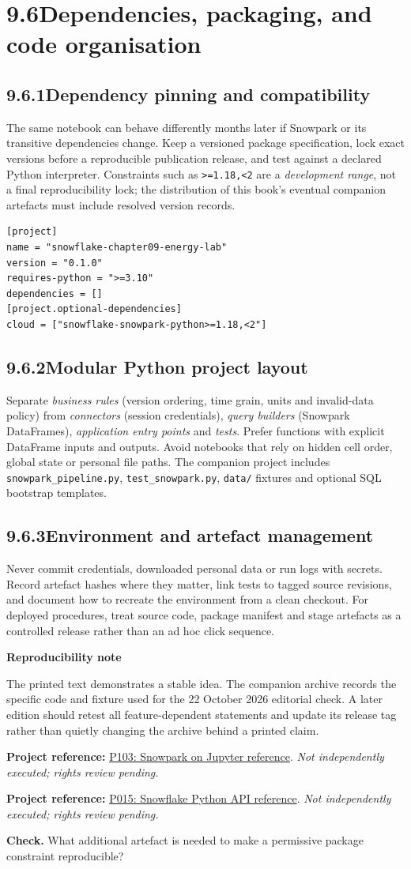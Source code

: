 \documentclass[11pt,twoside]{article}
\newcommand{\topic}[2]{\subsection*{#1\quad #2}}
\newcommand{\repo}[2]{\par\begingroup\fontsize{8.0}{9.6}\selectfont\sffamily\color{inkgray}\textbf{Project reference:} \href{#2}{#1}. \textit{Not independently executed; rights review pending.}\par\endgroup}
\begin{document}
\section*{9.6\quad Dependencies, packaging, and code organisation}
\topic{9.6.1}{Dependency pinning and compatibility}
The same notebook can behave differently months later if Snowpark or its transitive dependencies change. Keep a versioned package specification, lock exact versions before a reproducible publication release, and test against a declared Python interpreter. Constraints such as \texttt{>=1.18,<2} are a \emph{development range}, not a final reproducibility lock; the distribution of this book's eventual companion artefacts must include resolved version records.
\begin{lstlisting}[language={},caption={Project metadata; optional integrations are not installed for offline tests.}]
[project]
name = "snowflake-chapter09-energy-lab"
version = "0.1.0"
requires-python = ">=3.10"
dependencies = []
[project.optional-dependencies]
cloud = ["snowflake-snowpark-python>=1.18,<2"]
\end{lstlisting}
\topic{9.6.2}{Modular Python project layout}
Separate \emph{business rules} (version ordering, time grain, units and invalid-data policy) from \emph{connectors} (session credentials), \emph{query builders} (Snowpark DataFrames), \emph{application entry points} and \emph{tests}. Prefer functions with explicit DataFrame inputs and outputs. Avoid notebooks that rely on hidden cell order, global state or personal file paths. The companion project includes \texttt{snowpark\_pipeline.py}, \texttt{test\_snowpark.py}, \texttt{data/} fixtures and optional SQL bootstrap templates.
\topic{9.6.3}{Environment and artefact management}
Never commit credentials, downloaded personal data or run logs with secrets. Record artefact hashes where they matter, link tests to tagged source revisions, and document how to recreate the environment from a clean checkout. For deployed procedures, treat source code, package manifest and stage artefacts as a controlled release rather than an ad hoc click sequence.
\begin{insight}\textbf{Reproducibility note}\par
The printed text demonstrates a stable idea. The companion archive records the specific code and fixture used for the 22 October 2026 editorial check. A later edition should retest all feature-dependent statements and update its release tag rather than quietly changing the archive behind a printed claim.\end{insight}
\repo{P103: Snowpark on Jupyter reference}{https://github.com/Snowflake-Labs/sfguide_snowpark_on_jupyter}
\repo{P015: Snowflake Python API reference}{https://github.com/Snowflake-Labs/sfguide-snowflake-python-api}
\textbf{Check.} What additional artefact is needed to make a permissive package constraint reproducible?
\newpage
\end{document}
